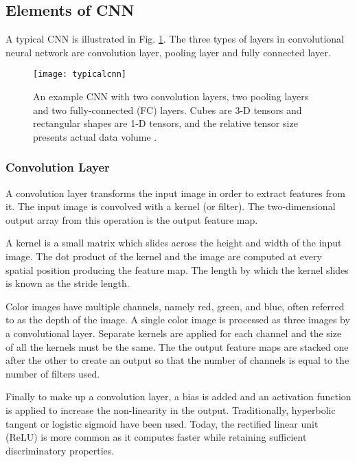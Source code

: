 \subsection{Elements of CNN}

A typical CNN is illustrated in Fig. \ref{typicalcnn}. The three types of layers in convolutional neural network are convolution layer, pooling layer and fully connected layer.

\begin{figure}[H]
\centering
\texttt{[image: typicalcnn]}
\caption{An example CNN with two convolution
layers, two pooling layers and two fully-connected (FC) layers.
Cubes are 3-D tensors and rectangular shapes are 1-D tensors,
and the relative tensor size presents actual data volume \cite{Chen2016}.}
\label{typicalcnn}
\end{figure}


\subsubsection*{Convolution Layer}

A convolution layer transforms the input image in order to extract features from it.
The input image is convolved with a kernel (or filter).
The two-dimensional output array from this operation is the output feature map.

A kernel is a small matrix which slides across the height and width of the  input image.
The dot product of the kernel and the image are computed at every spatial position producing the feature map.
The length by which the kernel slides is known as the stride length.

Color images have multiple channels, namely red, green, and blue, often referred to as the depth of the image.
A single color image is processed as three images by a convolutional layer.
Separate kernels are applied for each channel and the size of all the kernels must be the same.
The the output feature maps are stacked one after the other to create an output so that the number of channels is equal to the number of filters used. 

Finally to make up a convolution layer, a bias is added and an activation function is applied to increase the non-linearity in the output.
Traditionally, hyperbolic tangent or logistic sigmoid have been used. Today,  the rectified linear unit (ReLU) is more common as it computes faster while retaining sufficient discriminatory properties.

